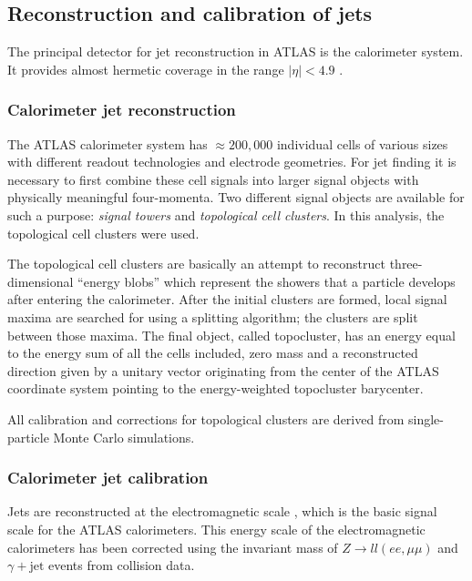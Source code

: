 \documentclass[12pt, twoside]{article}
\numberwithin{equation}{section}
\numberwithin{figure}{section}
\begin{document}
\subsection{Reconstruction and calibration of jets}
\label{subsec:JetReconstructionAndCalibration}

The principal detector for jet reconstruction in ATLAS is the calorimeter system. It provides almost hermetic coverage in the range $\left| \eta \right| < 4.9$ \cite{photonReconstruction_1}.

\subsubsection{Calorimeter jet reconstruction}
\label{subsubsec:CalorimeterJetReconstruction}

The ATLAS calorimeter system \cite{ATLAScalorimeter} has $\approx 200,000$ individual cells of various sizes with different readout technologies and electrode geometries. For jet finding it is necessary to first combine these cell signals into larger signal objects with physically meaningful four-momenta. Two different signal objects are available for such a purpose: \textit{signal towers} and \textit{topological cell clusters}. In this analysis, the topological cell clusters were used.

The topological cell clusters are basically an attempt to reconstruct three-dimensional ``energy blobs'' which represent the showers that a particle develops after entering the calorimeter. After the initial clusters are formed, local signal maxima are searched for using a splitting algorithm; the clusters are split between those maxima. The final object, called topocluster, has an energy equal to the energy sum of all the cells included, zero mass and a reconstructed direction given by a unitary vector originating from the center of the ATLAS coordinate system pointing to the energy-weighted topocluster barycenter.

All calibration and corrections for topological clusters are derived from single-particle Monte Carlo simulations.

\subsubsection{Calorimeter jet calibration}
\label{subsubsec:CalorimeterJetCalibration}

Jets are reconstructed at the electromagnetic scale \cite{JetCalib}, which is the basic signal scale for the ATLAS calorimeters. This energy scale of the electromagnetic calorimeters has been corrected using the invariant mass of $Z \rightarrow l l (ee, \mu \mu)$ and $\gamma + \text{jet}$ events from collision data.
\end{document}
